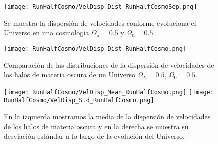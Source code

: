 \begin{figure}[H]
    \centering
    \texttt{[image: RunHalfCosmo/VelDisp\_Dist\_RunHalfCosmoSep.png]}
    \caption[Dispersión de velocidades en la evolución de un Universo $\Omega_\lambda = 0.5 $, $\Omega_0 = 0.5$]{\footnotesize Se muestra la dispersión de velocidades conforme evoluciona el Universo en una cosmología $\Omega_\lambda = 0.5 $ y $\Omega_0 = 0.5$.}
    \label{fig:HalfCosmo-VelDispDistSep}
\end{figure}

\begin{figure}[H]
    \centering
    \texttt{[image: RunHalfCosmo/VelDisp\_Dist\_RunHalfCosmo.png]}
    \caption[Distribución de la dispersión de velocidades de un Universo $\Omega_\lambda = 0.5 $, $\Omega_0 = 0.5$]{\footnotesize Comparación de las distribuciones de la dispersión de velocidades de los halos de materia oscura de un Universo $\Omega_\lambda = 0.5 $, $\Omega_0 = 0.5$.}
    \label{fig:HalfCosmo-VelDispDist}
\end{figure}

\begin{figure}[H]
    \centering
    \texttt{[image: RunHalfCosmo/VelDisp\_Mean\_RunHalfCosmo.png]}
    \texttt{[image: RunHalfCosmo/VelDisp\_Std\_RunHalfCosmo.png]}
    \caption[Media y desviación estándar de la dispersión de velocidades de un Universo $\Omega_\lambda = 0.5 $, $\Omega_0 = 0.5$]{\footnotesize En la izquierda mostramos la media de la dispersión de velocidades de los halos de materia oscura y en la derecha se muestra su desviación estándar a lo largo de la evolución del Universo.}
    \label{fig:HalfCosmo-VelDispStats}
\end{figure}


